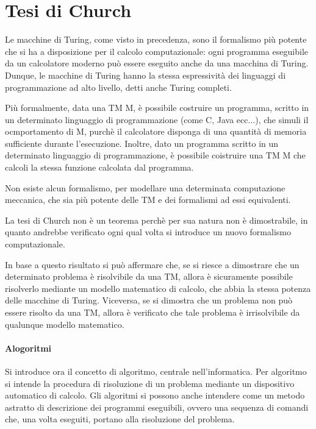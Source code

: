  \section{Tesi di Church}
  Le macchine di Turing, come visto in precedenza, sono il formalismo più potente che si ha a disposizione per il calcolo computazionale: ogni programma eseguibile da un calcolatore moderno può essere eseguito anche da una macchina di Turing. Dunque, le macchine di Turing hanno la stessa espressività dei linguaggi di programmazione ad alto livello, detti anche Turing completi. 

  Più formalmente, data una TM M, è possibile costruire un programma, scritto in un determinato linguaggio di programmazione (come C, Java ecc...), che simuli il ocmportamento di M, purchè il calcolatore disponga di una quantità di memoria sufficiente durante l'esecuzione. Inoltre, dato un programma scritto in un determinato linguaggio di programmazione, è possibile coistruire una TM M che calcoli la stessa funzione calcolata dal programma.

  \begin{thesis}
    Non esiste alcun formalismo, per modellare una determinata computazione meccanica, che sia più potente delle TM e dei formalismi ad essi equivalenti.
  \end{thesis}

  La tesi di Church non è un teorema perchè per sua natura non è dimostrabile, in quanto andrebbe verificato ogni qual volta si introduce un nuovo formalismo computazionale.

  In base a questo risultato si può affermare che, se si riesce a dimostrare che un determinato problema è risolvibile da una TM, allora è sicuramente possibile risolverlo mediante un modello matematico di calcolo, che abbia la stessa potenza delle macchine di Turing. Viceversa, se si dimostra che un problema non può essere risolto da una TM, allora è verificato che tale problema è irrisolvibile da qualunque modello matematico.

  \paragraph{Alogoritmi}
  Si introduce ora il concetto di algoritmo, centrale nell'informatica. Per algoritmo si intende la procedura di risoluzione di un problema mediante un dispositivo automatico di calcolo. Gli algoritmi si possono anche intendere come un metodo astratto di descrizione dei programmi eseguibili, ovvero una sequenza di comandi che, una volta eseguiti, portano alla risoluzione del problema.
  
